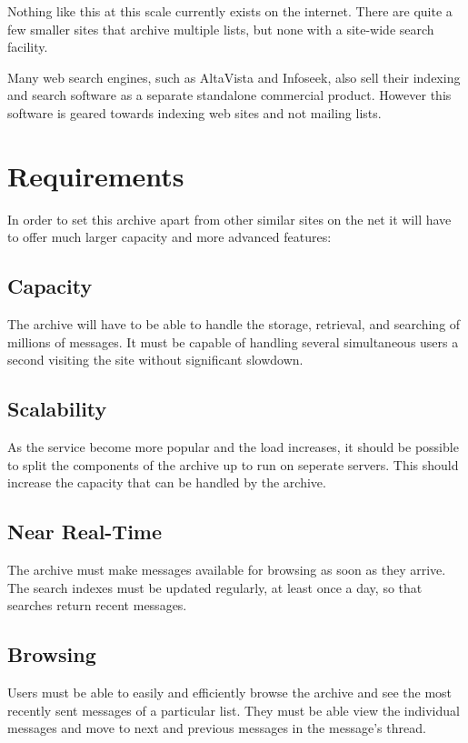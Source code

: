Nothing like this at this scale currently exists on the internet.
There are quite a few smaller sites that archive multiple lists, but
none with a site-wide search facility.

Many web search engines, such as AltaVista and Infoseek,  also sell
their indexing and search software as a separate standalone commercial
product.  However this software is geared towards indexing web sites
and not mailing lists.

\section{Requirements}
In order to set this archive apart from other similar sites on the net
it will have to offer much larger capacity and more advanced features:

\subsection*{Capacity}
The archive will have to be able to handle the storage, retrieval,
and searching of millions of messages.  It must be capable of handling 
several simultaneous users a second visiting the site without
significant slowdown.

\subsection*{Scalability}
As the service become more popular and the load increases, it should be  
possible to split the components of the archive up to run on seperate
servers.  This should increase the capacity that can be handled by the
archive.

\subsection*{Near Real-Time}
The archive must make messages available for browsing as soon as they
arrive.  The search indexes must be updated regularly, at least once a 
day, so that searches return recent messages. 

\subsection*{Browsing}
Users must be able to easily and efficiently browse the archive and
see the most recently sent messages of a particular list.  They must
be able view the individual messages and move to next and previous
messages in the message's thread. 


